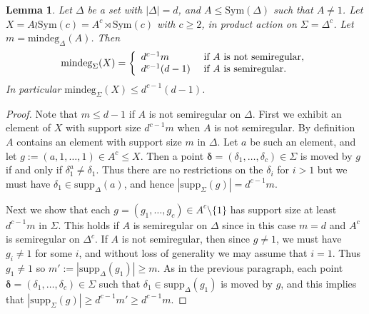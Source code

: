\documentclass[12pt]{amsart}
\newtheorem{lem}[thm]{Lemma}
\theoremstyle{remark}
\theoremstyle{definition}
\newcommand{\sym}{\mathrm{Sym}}
\newcommand{\supp}{\mathrm{supp}}
\begin{document}
\begin{lem} \label{lem:mindeg}
Let $\Delta$ be a set with $|\Delta| = d$, and $A \leqslant \sym(\Delta)$ such that $A\ne 1$. Let $X = A \wr \sym(c) = A^c \rtimes \sym(c)$ with $c \geqslant 2$, in product action on $\Sigma = \Delta^c$. Let $m = \textrm{mindeg}_\Delta(A)$. Then
\[
\textrm{mindeg}_\Sigma(X) =  \left \{ \begin{array}{l l }
	 d^{c-1}m & \text{ if $A$ is   not semiregular,} \\ 
	 d^{c-1}(d-1) &  \text{ if $A$ is   semiregular. } \end{array} \right .
	 \]
In particular $\textrm{mindeg}_\Sigma(X) \leqslant d^{c-1}(d-1)$.
\end{lem}

\begin{proof}
Note that $m \leqslant d-1$ if $A$ is not semiregular on $\Delta$. First we exhibit an element of $X$ with support size $d^{c-1}m$ when $A$ is not semiregular. By definition $A$ contains an element with support size $m$ in $\Delta$. Let $a$ be such an element, and let $g := (a,1,\dots,1) \in A^c \leqslant X$. Then a point ${\boldsymbol\delta} = (\delta_1, \dots, \delta_c) \in \Sigma$ is moved by $g$ if and only if $\delta_1^a \ne \delta_1$. Thus there are no restrictions on the $\delta_i$ for $i > 1$ but we must have $\delta_1 \in \supp_\Delta(a)$, and hence $|\supp_\Sigma(g)| = d^{c-1}m$.

Next we show that each $g = (g_1, \dots, g_c) \in A^c \setminus \{1\}$ has support size at least $d^{c-1}m$ in $\Sigma$. This holds if $A$ is semiregular on $\Delta$ since in this case $m=d$ and $A^c$ is semiregular on $\Delta^c$. If $A$ is not semiregular, then since $g \ne 1$, we must have $g_i \ne 1$ for some $i$, and without loss of generality we may assume that $i=1$. Thus $g_1 \ne 1$ so $m':= |\supp_\Delta(g_1)| \geqslant m$. As in the previous paragraph, each point  ${\boldsymbol\delta} = (\delta_1, \dots, \delta_c) \in \Sigma$ such that $\delta_1 \in \supp_\Delta(g_1)$  is moved by $g$, and this implies that $|\supp_\Sigma(g)| \geqslant d^{c-1}m' \geqslant d^{c-1}m$.


\end{proof}
\end{document}

